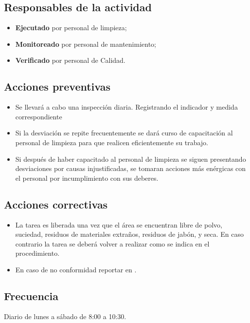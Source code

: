 \subsection{Responsables de la actividad}
\begin{itemize}
	\item \textbf{Ejecutado} por personal de limpieza;
	\item \textbf{Monitoreado} por personal de mantenimiento;
	\item \textbf{Verificado} por personal de Calidad.
\end{itemize}

\subsection{Acciones preventivas}
\begin{itemize}
	\item Se llevará a cabo una inspección diaria. Registrando el indicador y medida correspondiente
	\item Si la desviación se repite frecuentemente se dará curso de capacitación al personal de limpieza para que realicen eficientemente su trabajo.
	\item Si después de haber capacitado al personal de limpieza se siguen presentando desviaciones por causas injustificadas, se tomaran acciones más enérgicas con el personal por incumplimiento con sus deberes.
\end{itemize}

\subsection{Acciones correctivas}

\begin{itemize}
	\item La tarea es liberada una vez que el área se encuentran libre de polvo, suciedad, residuos de materiales extraños, residuos de jabón, y seca. En caso contrario la tarea se deberá volver a realizar como se indica en el procedimiento.
	\item En caso de no conformidad reportar en \RAC.
\end{itemize}

\subsection{Frecuencia}
Diario de lunes a sábado de 8:00 a 10:30.

